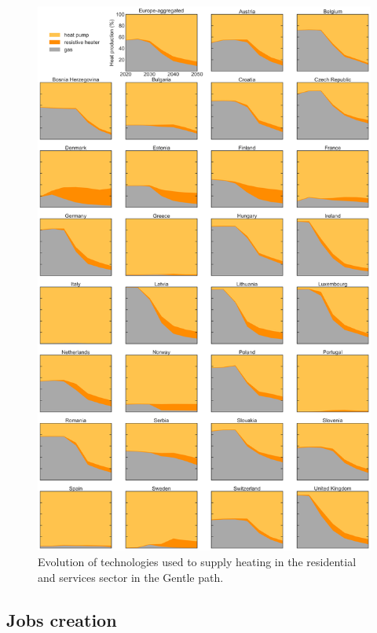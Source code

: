 \documentclass[3p]{elsarticle} %
\begin{document}
\begin{figure}[!h]
\centering
\includegraphics[width=0.8\columnwidth]{../figures/heat_production_Base_go.png}
\caption{Evolution of technologies used to supply heating in the residential and services sector in the Gentle path. } \label{fig_heating_shares} 
\end{figure}

\FloatBarrier

\subsection{Jobs creation}
\end{document}

